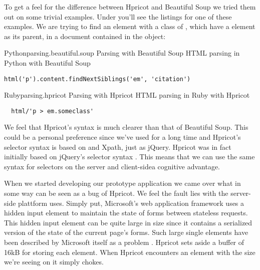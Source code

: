 To get a feel for the difference between Hpricot and Beautiful Soup we tried
them out on some trivial examples. Under you'll see the listings for one
of these examples. We are trying to find an  element with a class
of , which have a  element as its parent,
in a  document contained in the  object:

\begin{scode}{Python}{parsing.beautiful.soup}{%
  Parsing with Beautiful Soup}{%
  HTML parsing in Python with Beautiful Soup}
\begin{lstlisting}
html('p').content.findNextSiblings('em', 'citation')
\end{lstlisting}
\end{scode}

\begin{scode}{Ruby}{parsing.hpricot}{%
  Parsing with Hpricot}{%
  HTML parsing in Ruby with Hpricot}
\begin{lstlisting}
  html/'p > em.someclass'
\end{lstlisting}
\end{scode}

We feel that Hpricot's syntax is much clearer than that of Beautiful Soup.
This could be a personal preference since we've used  for a long
time and Hpricot's selector syntax is based on  and Xpath, just as
jQuery. Hpricot was in fact initially based on jQuery's selector syntax
\citep{why06}. This means that we can use the same syntax for selectors on the
server and client-side\emph{}a cognitive advantage.

When we started developing our prototype application we came over what in
some way can be seen as a bug of Hpricot. We feel the fault lies
with the server-side plattform \urort{} uses. Simply put, Microsoft's
 web application framework uses a hidden 
input element to maintain the state of  forms between
stateless  requests. This hidden input element can be quite large%
in size since it contains a serialized version of the state of the current
page's  forms. Such large single  elements have been
described by Microsoft itself as a problem \citep{mitchell04}.
Hpricot sets aside a buffer of 16kB for storing each  element.
When Hpricot encounters an element with the size we're seeing on \urort{}
it simply chokes.

